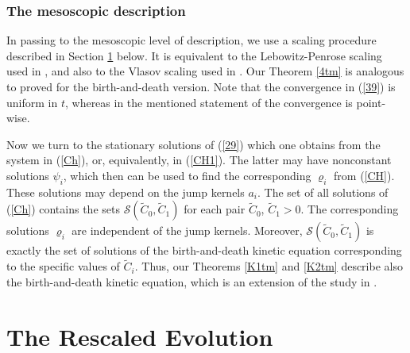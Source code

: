 \documentclass[reqno,11pt]{amsart}
\theoremstyle{definition}
\theoremstyle{remark}
\numberwithin{equation}{section}
\begin{document}
\subsubsection{The mesoscopic description}
In passing to the mesoscopic level of description, we use a scaling
procedure described in Section \ref{S4} below. It is equivalent to
the Lebowitz-Penrose scaling used in \cite{FKKO}, and also to the
Vlasov scaling used in \cite{BKKK,FKKK}. Our Theorem \ref{4tm} is
analogous to \cite[Theorem 2]{FKKO} proved for the birth-and-death
version. Note that the convergence in (\ref{39}) is uniform in $t$,
whereas in the mentioned statement of \cite{FKKO} the convergence is
point-wise.

Now we turn to the stationary solutions of (\ref{29}) which one
obtains from the system in (\ref{Ch}), or, equivalently, in
(\ref{CH1}). The latter may have nonconstant solutions $\psi_i$,
which then can be used to find the corresponding $\varrho_i$ from
(\ref{CH}). These solutions may depend on the jump kernels $a_i$.
The set of all solutions of (\ref{Ch}) contains the sets
$\mathcal{S}(\widetilde{C}_0, \widetilde{C}_1)$ for each pair
$\widetilde{C}_0$, $\widetilde{C}_1>0$. The corresponding solutions
$\varrho_i$ are independent of the jump kernels. Moreover,
$\mathcal{S}(\widetilde{C}_0, \widetilde{C}_1)$ is exactly the set
of solutions of the birth-and-death kinetic equation \cite[Eq.
(5.1)]{FKKO} corresponding to the specific values of
$\widetilde{C}_i$. Thus, our Theorems \ref{K1tm} and \ref{K2tm}
describe also the birth-and-death kinetic equation, which is an
extension of the study in \cite[Section 5]{FKKO}.

\section{The Rescaled Evolution}
\label{S4}
\end{document}
